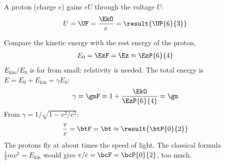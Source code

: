 \begin{abcliste}
\abc A proton (charge $e$) gains $e U$ through the voltage $U$:
\begin{align}
 U &= \UF = \frac{\EkO}{e} = \result{\UP{6}{3}}
\end{align}

\abc Compare the kinetic energy with the rest energy of the proton,
\begin{align}
 E_0 &= \EzF = \Ez \approx \EzP{6}{4}
\end{align}
$E_\mathrm{kin}/E_0$ is far from small: relativity is needed. The total energy is $E = E_0 + E_\mathrm{kin} = \gamma E_0$:
\begin{align}
 \gamma &= \gmF = 1 + \frac{\EkO}{\EzP{6}{4}} = \gm
\end{align}
From $\gamma = 1/\sqrt{1 - v^2/c^2}$:
\begin{align}
 \frac{v}{c} &= \btF = \bt \approx \result{\btP{0}{2}}
\end{align}
The protons fly at about  times the speed of light. The classical formula $\frac{1}{2} m v^2 = E_\mathrm{kin}$ would give $v/c = \bcF = \bcP{0}{2}$, too much.
\end{abcliste}
